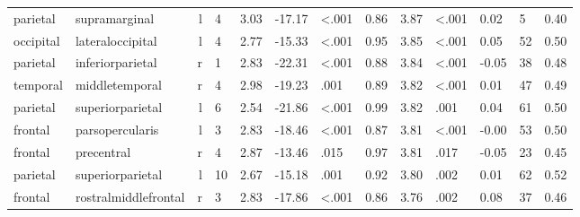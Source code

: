 \documentclass{article}
\begin{document}
\begin{longtable}{llrR{1.3cm}R{1cm}R{1.3cm}R{1cm}R{1cm}R{1.3cm}R{1cm}R{1.8cm}R{1.3cm}R{1.8cm}}
  parietal &             supramarginal &    l &         4 &                  3.03 &           -17.17 &      \textless.001 &                               0.86 &                          3.87 &                   \textless.001 &   0.02 &      5 &      0.40 \\
 occipital &          lateraloccipital &    l &         4 &                  2.77 &           -15.33 &      \textless.001 &                               0.95 &                          3.85 &                   \textless.001 &   0.05 &     52 &      0.50 \\
  parietal &          inferiorparietal &    r &         1 &                  2.83 &           -22.31 &      \textless.001 &                               0.88 &                          3.84 &                   \textless.001 &  -0.05 &     38 &      0.48 \\
  temporal &            middletemporal &    r &         4 &                  2.98 &           -19.23 &               .001 &                               0.89 &                          3.82 &                   \textless.001 &   0.01 &     47 &      0.49 \\
  parietal &          superiorparietal &    l &         6 &                  2.54 &           -21.86 &      \textless.001 &                               0.99 &                          3.82 &                            .001 &   0.04 &     61 &      0.50 \\
   frontal &           parsopercularis &    l &         3 &                  2.83 &           -18.46 &      \textless.001 &                               0.87 &                          3.81 &                   \textless.001 &  -0.00 &     53 &      0.50 \\
   frontal &                precentral &    r &         4 &                  2.87 &           -13.46 &               .015 &                               0.97 &                          3.81 &                            .017 &  -0.05 &     23 &      0.45 \\
  parietal &          superiorparietal &    l &        10 &                  2.67 &           -15.18 &               .001 &                               0.92 &                          3.80 &                            .002 &   0.01 &     62 &      0.52 \\
   frontal &      rostralmiddlefrontal &    r &         3 &                  2.83 &           -17.86 &      \textless.001 &                               0.86 &                          3.76 &                            .002 &   0.08 &     37 &      0.46 \\

\end{longtable}
\end{document}
